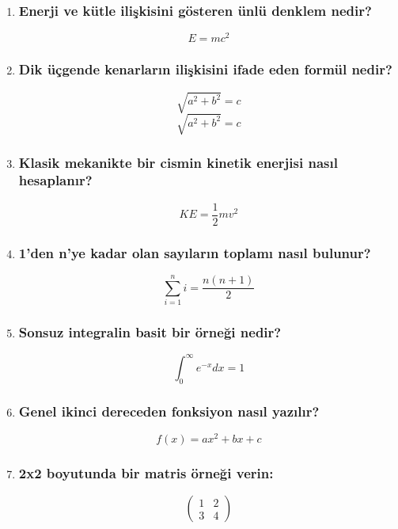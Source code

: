 \begin{enumerate}
\item \subsubsection{Enerji ve kütle ilişkisini gösteren ünlü denklem nedir?}
\[
E = mc^2
\]

\item \subsubsection{Dik üçgende kenarların ilişkisini ifade eden formül nedir?}
\[
\sqrt{a^2 + b^2} = c
\]
\[
\sqrt{a^2 + b^2} = c
\]

\item \subsubsection{Klasik mekanikte bir cismin kinetik enerjisi nasıl hesaplanır?}
\[
KE = \frac{1}{2} m v^2
\]

\item \subsubsection{1’den n’ye kadar olan sayıların toplamı nasıl bulunur?}
\[
\sum_{i=1}^{n} i = \frac{n(n+1)}{2}
\]

\item \subsubsection{Sonsuz integralin basit bir örneği nedir?}
\[
\int_0^\infty e^{-x} dx = 1
\]

\item \subsubsection{Genel ikinci dereceden fonksiyon nasıl yazılır?}
\[
f(x) = ax^2 + bx + c
\]

\item \subsubsection{2x2 boyutunda bir matris örneği verin:}
\[
\begin{pmatrix}
1 & 2 \\
3 & 4
\end{pmatrix}
\]

\end{enumerate}


